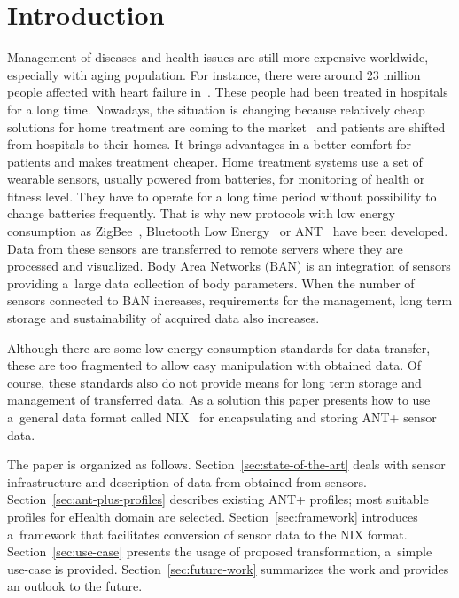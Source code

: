 \documentclass[conference]{IEEEtran}
\begin{document}
\section{Introduction}\label{sec:intro}
Management of diseases and health issues are still more expensive worldwide, especially with aging population. For instance, there were around 23 million people affected with heart failure in~\cite{bui2011epidemiology}. These people had been treated in hospitals for a long time. Nowadays, the situation is changing because relatively cheap solutions for home treatment are coming to the market~\cite{4761985, 5333913} and patients are shifted from hospitals to their homes. It brings advantages in a better comfort for patients and makes treatment cheaper. Home treatment systems use a set of wearable sensors, usually powered from batteries, for monitoring of health or fitness level. They have to operate for a long time period without possibility to change batteries frequently. That is why new protocols with low energy consumption as ZigBee~\cite{Farahani:2008:ZWN:1457417}, Bluetooth Low Energy~\cite{heydon2012bluetooth} or ANT~\cite{zaloker2014ant} have been developed. Data from these sensors are transferred to remote servers where they are processed and visualized. Body Area Networks (BAN) is an integration of sensors providing a~large data collection of body parameters.  When the number of sensors connected to BAN increases, requirements for the management, long term storage and sustainability of acquired data also increases.

Although there are some low energy consumption standards for data transfer, these are too fragmented to allow easy manipulation with obtained data. Of course, these standards also do not provide means for long term storage and management of transferred data. As a solution this paper presents how to use a~general data format called NIX~\cite{Stoewer:2014} for encapsulating and storing ANT+ sensor data.

The paper is organized as follows. Section~\ref{sec:state-of-the-art} deals with sensor infrastructure and description of data from obtained from sensors. Section~\ref{sec:ant-plus-profiles} describes existing ANT+ profiles; most suitable profiles for eHealth domain are selected. Section~\ref{sec:framework} introduces a~framework that facilitates conversion of sensor data to the NIX format. Section~\ref{sec:use-case} presents the usage of proposed transformation, a~simple use-case is provided. Section~\ref{sec:future-work} summarizes the work and provides an outlook to the future.
\end{document}
